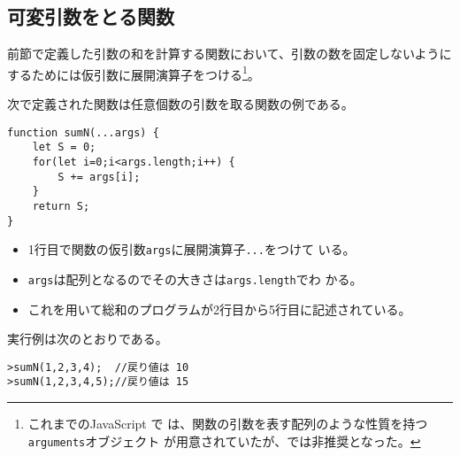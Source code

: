 \subsection{可変引数をとる関数}
前節で定義した引数の和を計算する関数において、引数の数を固定しないように
するためには仮引数に展開演算子をつける\footnote{これまでのJavaScript で
は、関数の引数を表す配列のような性質を持つ\texttt{arguments}オブジェクト
が用意されていたが、\ES では非推奨となった。}。
\begin{Exec}\upshape\label{DefOfFunctionwithIndefiniteArges}
次で定義された関数は任意個数の引数を取る関数の例である。
\begin{Verbatim}
function sumN(...args) {
    let S = 0;
    for(let i=0;i<args.length;i++) {
        S += args[i];
    }
    return S;
}
\end{Verbatim}
\begin{itemize}
 \item 1行目で関数の仮引数\texttt{args}に展開演算子\texttt{...}をつけて
       いる。
 \item \texttt{args}は配列となるのでその大きさは\texttt{args.length}でわ
       かる。
 \item これを用いて総和のプログラムが2行目から5行目に記述されている。
\end{itemize}
実行例は次のとおりである。
\begin{Verbatim}
>sumN(1,2,3,4);  //戻り値は 10
>sumN(1,2,3,4,5);//戻り値は 15
\end{Verbatim}

\end{Exec}

\fi

